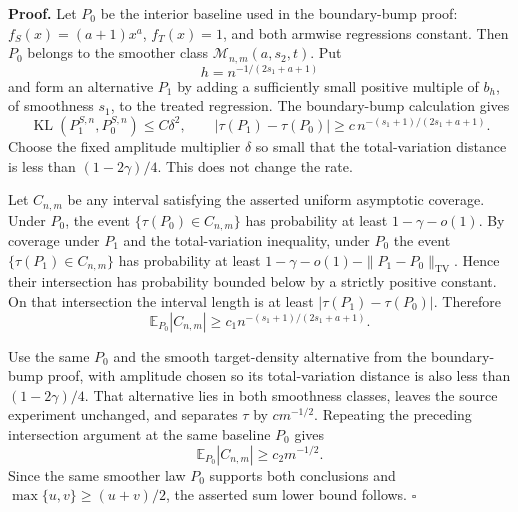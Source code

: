 \textbf{Proof.}
Let \(P_0\) be the interior baseline used in the boundary-bump proof: \(f_S(x)=(a+1)x^a\), \(f_T(x)=1\), and both armwise regressions constant.  Then \(P_0\) belongs to the smoother class \(\mathcal M_{n,m}(a,s_2,t)\).  Put
\[
 h=n^{-1/(2s_1+a+1)}
\]
and form an alternative \(P_1\) by adding a sufficiently small positive multiple of \(b_h\), of smoothness \(s_1\), to the treated regression.  The boundary-bump calculation gives
\[
 \operatorname{KL}(P_1^{S,n},P_0^{S,n})\le C\delta^2,
 \qquad
 |\tau(P_1)-\tau(P_0)|\ge c\,n^{-(s_1+1)/(2s_1+a+1)}.
\]
Choose the fixed amplitude multiplier \(\delta\) so small that the total-variation distance is less than \((1-2\gamma)/4\).  This does not change the rate.

Let \(C_{n,m}\) be any interval satisfying the asserted uniform asymptotic coverage.  Under \(P_0\), the event \(\{\tau(P_0)\in C_{n,m}\}\) has probability at least \(1-\gamma-o(1)\).  By coverage under \(P_1\) and the total-variation inequality, under \(P_0\) the event \(\{\tau(P_1)\in C_{n,m}\}\) has probability at least \(1-\gamma-o(1)-\|P_1-P_0\|_{\mathrm{TV}}\).  Hence their intersection has probability bounded below by a strictly positive constant.  On that intersection the interval length is at least \(|\tau(P_1)-\tau(P_0)|\).  Therefore
\[
 \mathbb E_{P_0}|C_{n,m}|
 \ge c_1 n^{-(s_1+1)/(2s_1+a+1)}.
\]

Use the same \(P_0\) and the smooth target-density alternative from the boundary-bump proof, with amplitude chosen so its total-variation distance is also less than \((1-2\gamma)/4\).  That alternative lies in both smoothness classes, leaves the source experiment unchanged, and separates \(\tau\) by \(cm^{-1/2}\).  Repeating the preceding intersection argument at the same baseline \(P_0\) gives
\[
 \mathbb E_{P_0}|C_{n,m}|\ge c_2m^{-1/2}.
\]
Since the same smoother law \(P_0\) supports both conclusions and \(\max\{u,v\}\ge(u+v)/2\), the asserted sum lower bound follows. \(\square\)